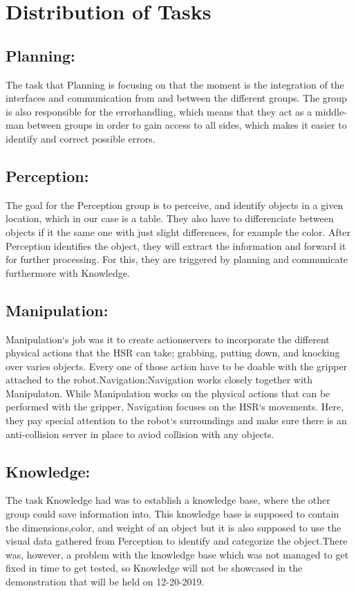 \documentclass[main.tex]{subfiles}
\begin{document}
	
	\chapter{Distribution of Tasks}

		\section{Planning:}
		The task that Planning is focusing on that the moment is the integration of the interfaces and communication from and between the different groups. The group is also responsible for the errorhandling, which means that they act as a middle-man between groups in order to gain access to all sides, which makes it easier to identify and correct possible errors.
		
		\section{Perception:}
		The goal for the Perception group is to perceive, and identify objects in a given location, which in our case is a table. They also have to differenciate between objects if it the same one with just slight differences, for example the color. After Perception identifies the object, they  will extract the information and forward it for further processing. For this, they are triggered by planning and communicate furthermore with Knowledge.
		
		\section{Manipulation:}
		Manipulation‘s job was it to create actionservers to incorporate the different physical actions that the HSR can take; grabbing, putting down, and knocking over varies objects. Every one of those action have to be doable with the gripper attached to the robot.Navigation:Navigation works closely together with Manipulaton. While Manipulation works on the physical actions that can be performed with the gripper, Navigation focuses on the HSR‘s movements. Here, they pay special attention to the robot‘s surroundings and make sure there is an anti-collision server in place to aviod collision with any objects.
		
		\section{Knowledge:}
		The task Knowledge had was to establish a knowledge base, where the other group could save information into. This knowledge base is supposed to contain the dimensions,color, and weight of an object but it is also supposed to use the visual data gathered from Perception to identify and categorize the object.There was, however, a problem with the knowledge base which was not managed to get fixed in time to get tested, so Knowledge will not be showcased in the demonstration that will be held on 12-20-2019.
		
\end{document}
